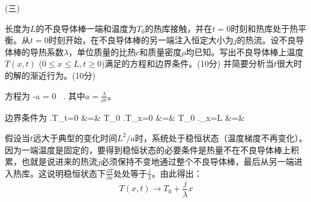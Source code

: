 \documentclass[12pt,CJK]{article}
\begin{document}
\item[(三)]{长度为$L$的不良导体棒一端和温度为$T_0$的热库接触，并在$t=0$时刻和热库处于热平衡。从$t=0$时刻开始，在不良导体棒的另一端注入恒定大小为$j$的热流。设不良导体棒的导热系数$\lambda$，单位质量的比热$c$和质量密度$\rho$均已知。写出不良导体棒上温度$T(x, t)$ ($0\le x\le L, t\ge 0$)满足的方程和边界条件。(10分) 并简要分析当$t$很大时的解的渐近行为。(10分)


  {\blue
    \skipline
    
    方程为
    \be
     -a = 0 \, .
    \ee
    其中$a= \frac{\lambda}{\rho c}$。

    边界条件为
    \bea
    \left.T\right\vert_{t=0} &=& T_0 \newl
    \left.T\right\vert_{x=0} &=& T_0 \newl
    \left.\right\vert_{x=L} &=& 
    \eea

    假设当$t$远大于典型的变化时间$L^2/a$时，系统处于稳恒状态（温度梯度不再变化）。因为一端温度是固定的，要得到稳恒状态的必要条件是热量不在不良导体棒上积累，也就是说进来的热流$j$必须保持不变地通过整个不良导体棒，最后从另一端进入热库。这说明稳恒状态下$\frac{\partial T}{\partial x}$处处等于$\frac{j}{\lambda}$。由此得出：
    $$T(x,t) \rightarrow T_0+\frac{j}{\lambda} x$$
    
    }
}
\eitem    


\ech
\end{document}
